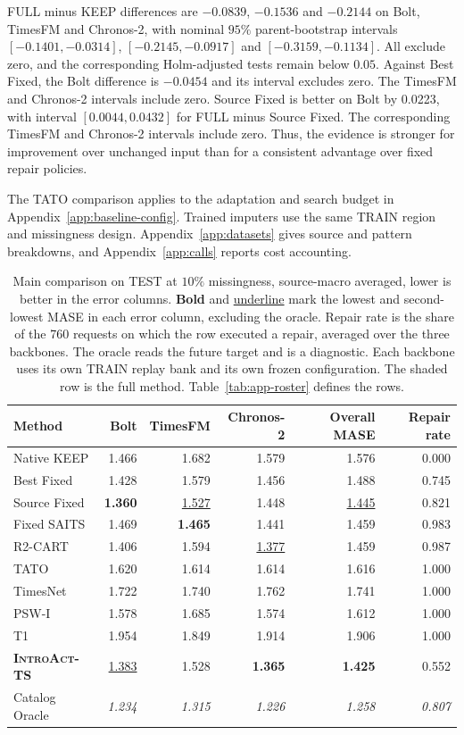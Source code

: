 \documentclass{article}
\newcommand{\best}[1]{\textbf{#1}}
\newcommand{\second}[1]{\underline{#1}}
\newcommand{\oracle}[1]{\textit{\textcolor{phgray}{#1}}}
\newcommand{\introact}{\textsc{IntroAct-TS}}
\begin{document}
FULL minus KEEP differences are $-0.0839$, $-0.1536$ and $-0.2144$ on Bolt, TimesFM
and Chronos-2, with nominal $95\%$ parent-bootstrap intervals
$[-0.1401,-0.0314]$, $[-0.2145,-0.0917]$ and $[-0.3159,-0.1134]$.
All exclude zero, and the corresponding Holm-adjusted tests remain below $0.05$.
Against Best Fixed, the Bolt difference is $-0.0454$ and its interval excludes zero.
The TimesFM and Chronos-2 intervals include zero. Source Fixed is better on Bolt by
0.0223, with interval $[0.0044,0.0432]$ for FULL minus Source Fixed. The corresponding
TimesFM and Chronos-2 intervals include zero. Thus, the evidence is stronger for improvement
over unchanged input than for a consistent advantage over fixed repair policies.

The TATO comparison applies to the adaptation and search budget in Appendix~\ref{app:baseline-config}.
Trained imputers use the same TRAIN region and missingness design. Appendix~\ref{app:datasets}
gives source and pattern breakdowns, and Appendix~\ref{app:calls} reports cost accounting.

\begin{table}[!t]
  \caption{Main comparison on TEST at $10\%$ missingness, source-macro averaged, lower is
  better in the error columns. \best{Bold} and \second{underline} mark the lowest and second-lowest MASE
  in each error column, excluding the oracle. Repair rate is the share of
  the 760 requests on which the row executed a repair, averaged over the three backbones. The
  oracle reads the future target and is a diagnostic. Each backbone uses its own TRAIN replay
  bank and its own frozen configuration. The shaded row is the full method. Table~\ref{tab:app-roster} defines the rows.}
  \label{tab:main}
  \centering
  \small
  \setlength{\tabcolsep}{3.5pt}
\begin{tabularx}{\textwidth}{@{}Xrrrrr@{}}
    \toprule
    Method & Bolt & TimesFM & Chronos-2 & Overall MASE & Repair rate \\
    \midrule
Native KEEP & 1.466 & 1.682 & 1.579 & 1.576 & 0.000 \\
    \midrule
Best Fixed & 1.428 & 1.579 & 1.456 & 1.488 & 0.745 \\
Source Fixed & \best{1.360} & \second{1.527} & 1.448 & \second{1.445} & 0.821 \\
Fixed SAITS & 1.469 & \best{1.465} & 1.441 & 1.459 & 0.983 \\
R2-CART & 1.406 & 1.594 & \second{1.377} & 1.459 & 0.987 \\
    \midrule
TATO & 1.620 & 1.614 & 1.614 & 1.616 & 1.000 \\
TimesNet & 1.722 & 1.740 & 1.762 & 1.741 & 1.000 \\
PSW-I & 1.578 & 1.685 & 1.574 & 1.612 & 1.000 \\
T1 & 1.954 & 1.849 & 1.914 & 1.906 & 1.000 \\
    \midrule
\rowcolor{bestgray}\textbf{\introact{}} & \second{1.383} & 1.528 & \best{1.365} & \best{1.425} & 0.552 \\
    \midrule
Catalog Oracle & \oracle{1.234} & \oracle{1.315} & \oracle{1.226} & \oracle{1.258} & \oracle{0.807} \\
    \bottomrule
  \end{tabularx}
\end{table}
\end{document}
